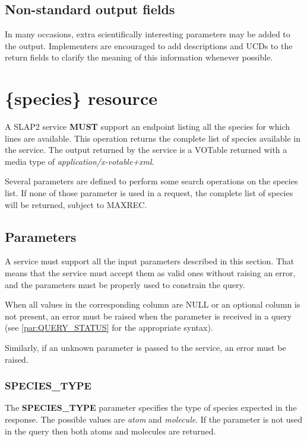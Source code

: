 \documentclass[11pt,a4paper]{ivoa}
\begin{document}
\subsection{Non-standard output fields}
\label{sect:lines-nonstd}

In many occasions, extra scientifically interesting parameters may be
added to the output. Implementers are encouraged to add descriptions and
UCDs to the return fields to clarify the meaning of this information
whenever possible.


\section{\{species\} resource}
\label{sect:species}

A SLAP2 service \textbf{MUST} support an endpoint listing all
the species for which lines are available. This operation returns the
complete list of species available in the service. The
output returned by the service is a VOTable
returned with a media type of
\textit{application/x-votable+xml}.

Several parameters are defined to perform some
search operations on the species list. If none of those parameter is used
in a request, the complete list of species will be returned, subject
to MAXREC.



\subsection{Parameters}
\label{sect:species-optional-parameters}

A service must support all the input parameters described in this section.
That means that the service must accept them as valid ones without
raising an error, and the parameters must be properly used to constrain
the query.

When all values in the corresponding column are NULL or an optional column is not present,
an error must be raised when the parameter is received in a query (see \ref{par:QUERY_STATUS} for the appropriate syntax).

Similarly, if an unknown parameter is passed to the service, an error must be raised.

\subsubsection{SPECIES\_TYPE}

The \textbf{SPECIES\_TYPE} parameter specifies the type of species expected in the response.
The possible values are \textit{atom} and \textit{molecule}.
If the parameter is not used in the query then both atoms and molecules are returned.
\end{document}
